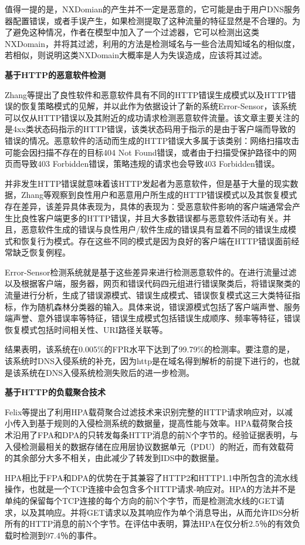 \documentclass[12pt]{article} %
\begin{document}
值得一提的是，NXDomian的产生并不一定是恶意的，它可能是由于用户DNS服务器配置错误，或者手误产生，如果检测提取了这种流量的特征显然是不合理的。为了避免这种情况，作者在模型中加入了一个过滤器，它可以检测出这类NXDomain，并将其过滤，利用的方法是检测域名与一些合法周知域名的相似度，若相似，则说明这类NXDomain大概率是人为失误造成，应该将其过滤。

\textbf{基于HTTP的恶意软件检测}

Zhang等提出了良性软件和恶意软件具有不同的HTTP错误生成模式以及HTTP错误的恢复策略模式的见解，并以此作为依据设计了新的系统Error-Sensor，该系统可以仅从HTTP错误以及其附近的成功请求检测恶意软件流量。该文章主要关注的是4xx类状态码指示的HTTP错误，该类状态码用于指示的是由于客户端而导致的错误的情况。恶意软件的活动而生成的HTTP错误大多属于该类别：网络扫描攻击可能会因扫描不存在的目标404 Not Found错误，或者由于扫描受保护路径中的网页而导致403 Forbidden错误，策略违规的请求也会导致403 Forbidden错误。

并非发生HTTP错误就意味着该HTTP发起者为恶意软件，但是基于大量的现实数据，Zhang等观察到良性用户和恶意用户所生成的HTTP错误模式以及其恢复模式存在差异，该差异具体表现为，具体的表现为：受恶意软件影响的客户端通常会产生比良性客户端更多的HTTP错误，并且大多数错误都与恶意软件活动有关。并且，恶意软件生成的错误与良性用户/软件生成的错误具有显着不同的错误生成模式和恢复行为模式。存在这些不同的模式是因为良好的客户端在HTTP错误面前经常缺乏恢复例程。

Error-Sensor检测系统就是基于这些差异来进行检测恶意软件的。在进行流量过滤以及根据客户端，服务器，网页和错误代码四元组进行错误聚类后，将错误聚类的流量进行分析，生成了错误源模式、错误生成模式、错误恢复模式这三大类特征指标，作为随机森林分类器的输入。具体来说，错误源模式包括了客户端声誉、服务端声誉、意外错误率等特征，错误生成模式包括错误生成顺序、频率等特征，错误恢复模式包括时间相关性、URI路径关联等。

结果表明，该系统在0.005\%的FPR水平下达到了99.79\%的检测率。要注意的是，该系统时DNS入侵系统的补充，因为http是在域名得到解析的前提下进行的，也就是该系统在DNS入侵系统检测失败后的进一步检测。

\textbf{基于HTTP的负载聚合技术}

Felix等提出了利用HPA载荷聚合过滤技术来识别完整的HTTP请求响应对，以减小传入到基于规则的入侵检测系统的数据量，提高性能与效率。HPA载荷聚合技术沿用了FPA和DPA的只转发每条HTTP消息的前N个字节的。经验证据表明，与入侵检测最相关的数据存储在应用层协议数据单元（PDU）的附近，而有效载荷的其余部分大多不相关，由此减少了转发到IDS中的数据量。

HPA相比于FPA和DPA的优势在于其兼容了HTTP2和HTTP1.1中所包含的流水线操作，也就是一个TCP连接中会包含多个HTTP请求-响应对。HPA的方法并不是单纯的保留每个TCP连接的每个方向的前N个字节，而是检测流水线的GET请求，以及其响应。并将GET请求以及其响应作为单个消息导出，从而允许IDS分析所有的HTTP消息的前N个字节。在评估中表明，算法HPA在仅分析2.5％的有效负载时检测到97.4％的事件。
\end{document}
